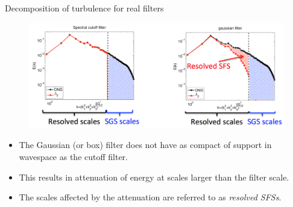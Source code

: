 \begin{frame}{Decomposition of turbulence for real filters}
\begin{figure}
	\includegraphics[width=1\textwidth]{filter_decomp.png}
\end{figure}
\begin{itemize}
	\item The Gaussian (or box) filter does not have as compact of support in wavespace as the cutoff filter.
	\item This results in attenuation of energy at scales larger than the filter scale.
	\item The scales affected by the attenuation are referred to as \textit{resolved SFSs}.
\end{itemize}
\end{frame}






































